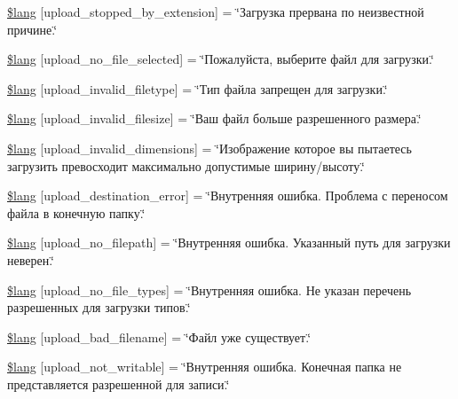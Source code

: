 \begin{DoxyCompactItemize}
\item 
\hyperlink{application_2language_2russian_2upload__lang_8php_ae97257deea3dddb33be4bbc6510a464b}{\$lang} \mbox{[}\textquotesingle{}upload\+\_\+stopped\+\_\+by\+\_\+extension\textquotesingle{}\mbox{]} = \char`\"{}Загрузка прервана по неизвестной причине.\char`\"{}
\item 
\hyperlink{application_2language_2russian_2upload__lang_8php_a88d8e8f9b879d1c25e6c089f3d3b5a30}{\$lang} \mbox{[}\textquotesingle{}upload\+\_\+no\+\_\+file\+\_\+selected\textquotesingle{}\mbox{]} = \char`\"{}Пожалуйста, выберите файл для загрузки.\char`\"{}
\item 
\hyperlink{application_2language_2russian_2upload__lang_8php_ac8631aa85ed80396bd78e91a76d5fd38}{\$lang} \mbox{[}\textquotesingle{}upload\+\_\+invalid\+\_\+filetype\textquotesingle{}\mbox{]} = \char`\"{}Тип файла запрещен для загрузки.\char`\"{}
\item 
\hyperlink{application_2language_2russian_2upload__lang_8php_a832b3ec1d84b1d48a488cf525954d8f2}{\$lang} \mbox{[}\textquotesingle{}upload\+\_\+invalid\+\_\+filesize\textquotesingle{}\mbox{]} = \char`\"{}Ваш файл больше разрешенного размера.\char`\"{}
\item 
\hyperlink{application_2language_2russian_2upload__lang_8php_a4e796eeccf7df90acffea7884a5bd558}{\$lang} \mbox{[}\textquotesingle{}upload\+\_\+invalid\+\_\+dimensions\textquotesingle{}\mbox{]} = \char`\"{}Изображение которое вы пытаетесь загрузить превосходит максимально допустимые ширину/высоту.\char`\"{}
\item 
\hyperlink{application_2language_2russian_2upload__lang_8php_a31be70c748b9bfc43dd7468e1fa64c42}{\$lang} \mbox{[}\textquotesingle{}upload\+\_\+destination\+\_\+error\textquotesingle{}\mbox{]} = \char`\"{}Внутренняя ошибка. Проблема с переносом файла в конечную папку.\char`\"{}
\item 
\hyperlink{application_2language_2russian_2upload__lang_8php_a3c17908c53072c6a5ef593760aaaa704}{\$lang} \mbox{[}\textquotesingle{}upload\+\_\+no\+\_\+filepath\textquotesingle{}\mbox{]} = \char`\"{}Внутренняя ошибка. Указанный путь для загрузки неверен.\char`\"{}
\item 
\hyperlink{application_2language_2russian_2upload__lang_8php_ab188c98e583c81905dedaad54ad452bb}{\$lang} \mbox{[}\textquotesingle{}upload\+\_\+no\+\_\+file\+\_\+types\textquotesingle{}\mbox{]} = \char`\"{}Внутренняя ошибка. Не указан перечень разрешенных для загрузки типов.\char`\"{}
\item 
\hyperlink{application_2language_2russian_2upload__lang_8php_abb379322384f3f35952a539c63e2c8f7}{\$lang} \mbox{[}\textquotesingle{}upload\+\_\+bad\+\_\+filename\textquotesingle{}\mbox{]} = \char`\"{}Файл уже существует.\char`\"{}
\item 
\hyperlink{application_2language_2russian_2upload__lang_8php_aed6bfb5a9094179427f61fcbb582145b}{\$lang} \mbox{[}\textquotesingle{}upload\+\_\+not\+\_\+writable\textquotesingle{}\mbox{]} = \char`\"{}Внутренняя ошибка. Конечная папка не представляется разрешенной для записи.\char`\"{}
\end{DoxyCompactItemize}


